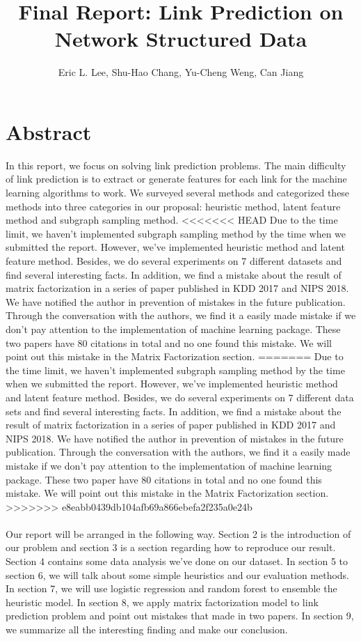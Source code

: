 \documentclass[12pt]{article}
\begin{document}
 
\title{Final Report: Link Prediction on Network Structured Data}
\author{Eric L. Lee, Shu-Hao Chang, Yu-Cheng Weng, Can Jiang} 
\maketitle

\section{Abstract}

In this report, we focus on solving link prediction problems. The main difficulty of link prediction is to extract or generate features for each link for the machine learning algorithms to work. We surveyed several methods and categorized these methods into three categories in our proposal: heuristic method, latent feature method and subgraph sampling method.
<<<<<<< HEAD
Due to the time limit, we haven't implemented subgraph sampling method by the time when we submitted the report. However, we've implemented heuristic method and latent feature method. Besides, we do several experiments on 7 different datasets and find several interesting facts. In addition, we find a mistake about the result of matrix factorization in a series of paper published in KDD 2017 and NIPS 2018. We have notified the author in prevention of mistakes in the future publication. Through the conversation with the authors, we find it a easily made mistake if we don't pay attention to the implementation of machine learning package. These two papers have 80 citations in total and no one found this mistake. We will point out this mistake in the Matrix Factorization section.
=======
Due to the time limit, we haven't implemented subgraph sampling method by the time when we submitted the report. However, we've implemented heuristic method and latent feature method. Besides, we do several experiments on 7 different data sets and find several interesting facts. In addition, we find a mistake about the result of matrix factorization in a series of paper published in KDD 2017 and NIPS 2018. We have notified the author in prevention of mistakes in the future publication. Through the conversation with the authors, we find it a easily made mistake if we don't pay attention to the implementation of machine learning package. These two paper have 80 citations in total and no one found this mistake. We will point out this mistake in the Matrix Factorization section.
>>>>>>> e8eabb0439db104afb69a866ebefa2f235a0e24b
\\ \\
Our report will be arranged in the following way. Section 2 is the introduction of our problem and section 3 is a section regarding how to reproduce our result. Section 4 contains some data analysis we've done on our dataset. In section 5 to section 6, we will talk about some simple heuristics and our evaluation methods. In section 7, we will use logistic regression and random forest to ensemble the heuristic model. In section 8, we apply matrix factorization model to link prediction problem and point out mistakes that made in two papers. In section 9, we summarize all the interesting finding and make our conclusion.
\end{document}

